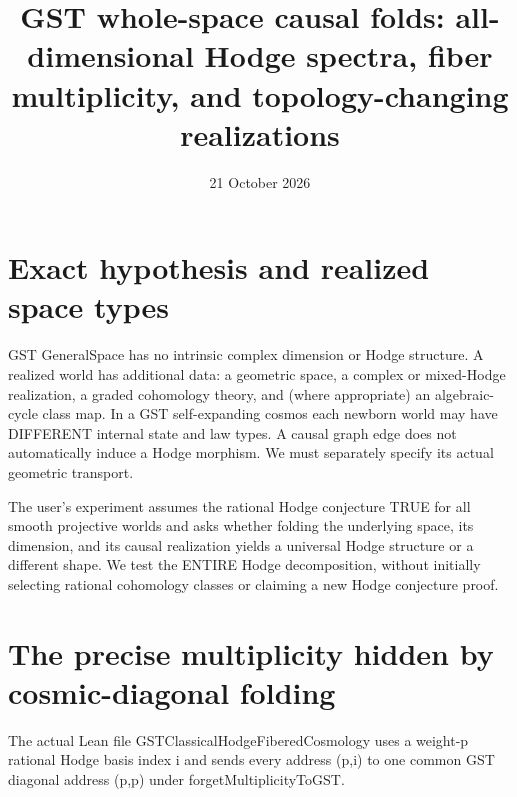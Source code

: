 \documentclass[11pt]{article}
\title{GST whole-space causal folds: all-dimensional Hodge spectra, fiber multiplicity, and topology-changing realizations}
\date{21 October 2026}
\begin{document}
\maketitle

\section{Exact hypothesis and realized space types}
GST GeneralSpace has no intrinsic complex dimension or Hodge structure.
A realized world has additional data: a geometric space, a complex
or mixed-Hodge realization, a graded cohomology theory, and (where
appropriate) an algebraic-cycle class map. In a GST self-expanding
cosmos each newborn world may have DIFFERENT internal state and law
types. A causal graph edge does not automatically induce a Hodge
morphism. We must separately specify its actual geometric transport.

The user's experiment assumes the rational Hodge conjecture TRUE for
all smooth projective worlds and asks whether folding the underlying
space, its dimension, and its causal realization yields a universal
Hodge structure or a different shape. We test the ENTIRE Hodge
decomposition, without initially selecting rational cohomology
classes or claiming a new Hodge conjecture proof.

\section{The precise multiplicity hidden by cosmic-diagonal folding}
The actual Lean file GSTClassicalHodgeFiberedCosmology uses a
weight-p rational Hodge basis index i and sends every address
(p,i) to one common GST diagonal address (p,p) under
forgetMultiplicityToGST.
\end{document}
